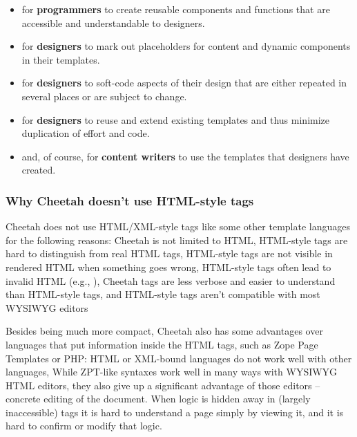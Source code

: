 \begin{itemize}
     \begin{itemize}
     \item for {\bf programmers} to create reusable components and functions
          that are accessible and understandable to designers.
     \item for {\bf designers} to mark out placeholders for content and 
          dynamic components in their templates.
     \item for {\bf designers} to soft-code aspects of their design that are
          either repeated in several places or are subject to change.
     \item for {\bf designers} to reuse and extend existing templates and thus
          minimize duplication of effort and code.
     \item and, of course, for {\bf content writers} to use the templates that
          designers have created.
     \end{itemize}

\end{itemize}

\subsubsection{Why Cheetah doesn't use HTML-style tags}
\label{intro.htmlStyleTags}

Cheetah does not use HTML/XML-style tags like some other template languages for
the following reasons:
 Cheetah is not limited to HTML,
 HTML-style tags are hard to distinguish from real HTML tags,
 HTML-style tags are not visible in rendered HTML when something goes wrong,
 HTML-style tags often lead to invalid HTML (e.g., 
),
Cheetah tags are less verbose and easier to understand than HTML-style tags, 
and HTML-style tags aren't compatible with most WYSIWYG editors

Besides being much more compact, Cheetah also has some advantages over
languages that put information inside the HTML tags, such as Zope Page
Templates or PHP:
 HTML or XML-bound languages do not work well with other languages,
 While ZPT-like syntaxes work well in many ways with WYSIWYG HTML editors,
     they also give up a significant advantage of those editors -- concrete
     editing of the document.  When logic is hidden away in (largely
     inaccessible) tags it is hard to understand a page simply by viewing it,
     and it is hard to confirm or modify that logic.

